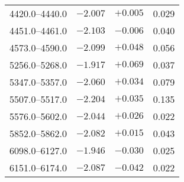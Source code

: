 \documentclass{aa}
\begin{document}
\begin{appendix}
\begin{table}
{\begin{tabular}{lccc}
4420.0--4440.0 & $-2.007$ & $+0.005$ & 0.029\\
4451.0--4461.0 & $-2.103$ & $-0.006$ & 0.040\\
4573.0--4590.0 & $-2.099$ & $+0.048$ & 0.056\\
5256.0--5268.0 & $-1.917$ & $+0.069$ & 0.037\\
5347.0--5357.0 & $-2.060$ & $+0.034$ & 0.079\\
5507.0--5517.0 & $-2.204$ & $+0.035$ & 0.135\\
5576.0--5602.0 & $-2.044$ & $+0.026$ & 0.022\\
5852.0--5862.0 & $-2.082$ & $+0.015$ & 0.043\\
6098.0--6127.0 & $-1.946$ & $-0.030$ & 0.025\\
6151.0--6174.0 & $-2.087$ & $-0.042$ & 0.022\\
\hline
\end{tabular}
}
\end{table}


\end{appendix}
\end{document}
